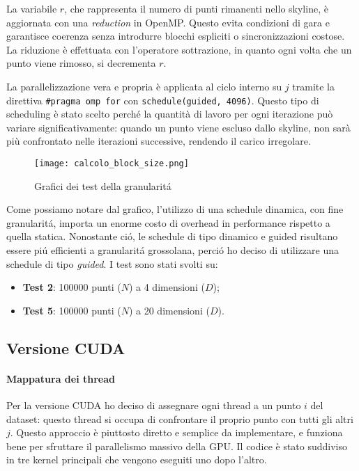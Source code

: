 \documentclass[a4paper,12pt,oneside]{article}
\newcommand{\code}[1]{\texttt{#1}}
\begin{document}
La variabile $r$, che rappresenta il numero di punti rimanenti nello skyline, è aggiornata con una \textit{reduction} in OpenMP. Questo evita condizioni di gara e garantisce coerenza senza introdurre blocchi espliciti o sincronizzazioni costose. La riduzione è effettuata con l’operatore sottrazione, in quanto ogni volta che un punto viene rimosso, si decrementa $r$.

La parallelizzazione vera e propria è applicata al ciclo interno su $j$ tramite la direttiva \code{\#pragma omp for} con \code{schedule(guided, 4096)}. Questo tipo di scheduling è stato scelto perché la quantità di lavoro per ogni iterazione può variare significativamente: quando un punto viene escluso dallo skyline, non sarà più confrontato nelle iterazioni successive, rendendo il carico irregolare. 

\begin{figure}[H]
    \centering
    \texttt{[image: calcolo\_block\_size.png]}
    \caption{Grafici dei test della granularitá}
    \label{fig:calcolo-block-size}
\end{figure}

Come possiamo notare dal grafico, l'utilizzo di una schedule dinamica, con fine granularitá, importa un enorme costo di overhead in performance rispetto a quella statica. Nonostante ció, le schedule di tipo dinamico e guided risultano essere piú efficienti a granularitá grossolana, perció ho deciso di utilizzare una schedule di tipo \emph{guided}. I test sono stati svolti su:
\begin{itemize}
    \item \textbf{Test 2}: 100000 punti ($N$) a 4 dimensioni ($D$);
    \item \textbf{Test 5}: 100000 punti ($N$) a 20 dimensioni ($D$).
\end{itemize}

\subsection{Versione CUDA}

\paragraph{Mappatura dei thread}
Per la versione CUDA ho deciso di assegnare ogni thread a un punto $i$ del dataset: questo thread si occupa di confrontare il proprio punto con tutti gli altri $j$. Questo approccio è piuttosto diretto e semplice da implementare, e funziona bene per sfruttare il parallelismo massivo della GPU. Il codice è stato suddiviso in tre kernel principali che vengono eseguiti uno dopo l'altro.
\end{document}
